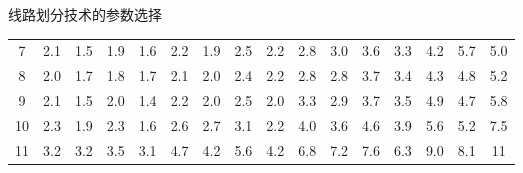 \documentclass[aspectratio=1610]{ctexbeamer}
\begin{document}
\begin{frame}{线路划分技术的参数选择}
\begin{table}[!htbp]
{\begin{tabular}{c|ccccccccccccccc}
            \rowcolor[HTML]{FFFFFF} 
            7                          & \multicolumn{1}{l|}{\cellcolor[HTML]{FFFFFF}2.1} & \cellcolor[HTML]{CCC0DA}1.5 & \cellcolor[HTML]{CCC0DA}1.9 & \cellcolor[HTML]{CCC0DA}1.6 & 2.2                         & \multicolumn{1}{l|}{\cellcolor[HTML]{CCC0DA}1.9} & 2.5                        & 2.2                         & 2.8                         & 3.0                         & 3.6                         & 3.3                       & 4.2                         & 5.7                         & 5.0                         \\
            \rowcolor[HTML]{FFFFFF} 
            8                          & \multicolumn{1}{l|}{\cellcolor[HTML]{CCC0DA}2.0} & \cellcolor[HTML]{CCC0DA}1.7 & \cellcolor[HTML]{CCC0DA}1.8 & \cellcolor[HTML]{CCC0DA}1.7 & 2.1                         & \multicolumn{1}{l|}{\cellcolor[HTML]{CCC0DA}2.0} & 2.4                        & 2.2                         & 2.8                         & 2.8                         & 3.7                         & 3.4                         & 4.3                         & 4.8                         & 5.2                         \\
            \rowcolor[HTML]{FFFFFF} 
            9                          & \multicolumn{1}{l|}{\cellcolor[HTML]{FFFFFF}2.1} & \cellcolor[HTML]{B1A0C7}1.5 & \cellcolor[HTML]{CCC0DA}2.0 & \cellcolor[HTML]{B1A0C7}1.4 & 2.2                         & \multicolumn{1}{l|}{\cellcolor[HTML]{CCC0DA}2.0} & 2.5                        & \cellcolor[HTML]{CCC0DA}2.0 & 3.3                         & 2.9                         & 3.7                         & 3.5                         & 4.9                         & 4.7                         & 5.8                         \\ \cline{3-7}
            \rowcolor[HTML]{FFFFFF} 
            10                         & 2.3                                              & \cellcolor[HTML]{CCC0DA}1.9 & 2.3                         & \cellcolor[HTML]{CCC0DA}1.6 & 2.6                         & 2.7                                              & 3.1                        & 2.2                         & 4.0                         & 3.6                         & 4.6                         & 3.9                         & 5.6                         & 5.2                         & 7.5                         \\
            \rowcolor[HTML]{FFFFFF} 
            11                         & 3.2                                              & 3.2                         & 3.5                         & 3.1                         & 4.7                         & 4.2                                              & 5.6                        & 4.2                         & 6.8                         & 7.2                         & 7.6                         & 6.3                         & 9.0                         & 8.1                         & \cellcolor[HTML]{8DB4E2}11  \\

\end{tabular}}
\end{table}
\end{frame}
\end{document}
